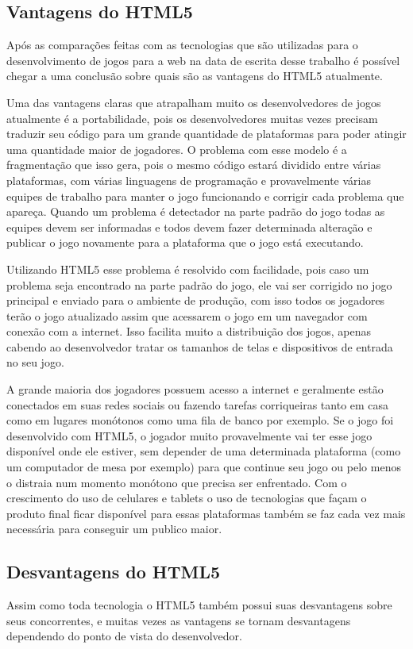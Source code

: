 \subsection{Vantagens do HTML5}
Após as comparações feitas com as tecnologias que são utilizadas para
o desenvolvimento de jogos para a web na data de escrita desse
trabalho é possível chegar a uma conclusão sobre quais são
as vantagens do HTML5 atualmente.

Uma das vantagens claras que atrapalham muito os desenvolvedores de
jogos atualmente é a portabilidade, pois os desenvolvedores muitas
vezes precisam traduzir seu código para um grande quantidade de
plataformas para poder atingir uma quantidade maior de jogadores. O
problema com esse modelo é a fragmentação que isso gera, pois o mesmo
código estará dividido entre várias plataformas, com várias linguagens
de programação e provavelmente várias equipes de trabalho para manter
o jogo funcionando e corrigir cada problema que apareça. Quando um
problema é detectador na parte padrão do jogo todas as equipes devem
ser informadas e todos devem fazer determinada alteração e publicar o
jogo novamente para a plataforma que o jogo está executando.

Utilizando HTML5 esse problema é resolvido com facilidade, pois caso
um problema seja encontrado na parte padrão do jogo, ele vai ser
corrigido no jogo principal e enviado para o ambiente de produção, com
isso todos os jogadores terão o jogo atualizado assim que acessarem o
jogo em um navegador com conexão com a internet. Isso facilita muito a
distribuição dos jogos, apenas cabendo ao desenvolvedor tratar os
tamanhos de telas e dispositivos de entrada no seu jogo.

A grande maioria dos jogadores possuem acesso a internet e geralmente
estão conectados em suas redes sociais ou fazendo tarefas corriqueiras
tanto em casa como em lugares monótonos como uma fila de banco por
exemplo. Se o jogo foi desenvolvido com HTML5, o jogador muito
provavelmente vai ter esse jogo disponível onde ele estiver, sem
depender de uma determinada plataforma (como um computador de mesa por
exemplo) para que continue seu jogo ou pelo menos o distraia num
momento monótono que precisa ser enfrentado. Com o crescimento do uso
de celulares e tablets o uso de tecnologias que façam o produto final
ficar disponível para essas plataformas também se faz cada vez mais
necessária para conseguir um publico maior.

\subsection{Desvantagens do HTML5}
Assim como toda tecnologia o HTML5 também possui suas desvantagens
sobre seus concorrentes, e muitas vezes as vantagens se tornam
desvantagens dependendo do ponto de vista do desenvolvedor.


